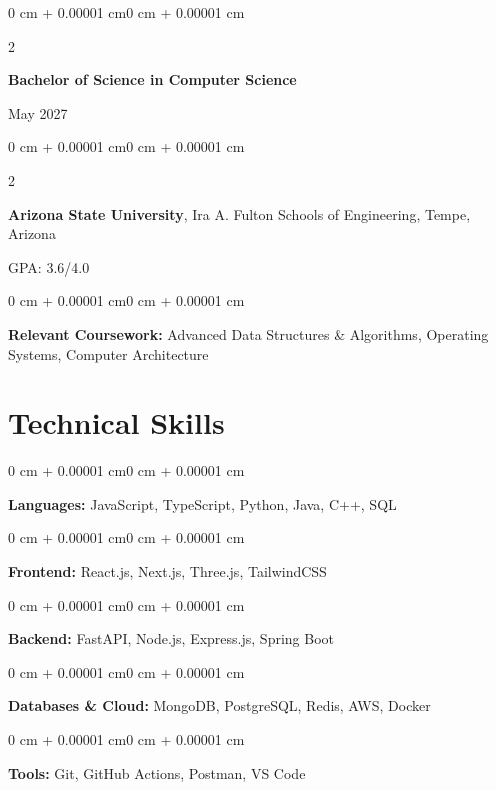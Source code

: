 \documentclass[10pt]{article}
\newenvironment{onecolentry}{
    \begin{adjustwidth}{0 cm + 0.00001 cm}{0 cm + 0.00001 cm}
}{
    \end{adjustwidth}
}
\newenvironment{twocolentry}[2][]{
    \onecolentry
    \def\secondColumn{#2}
    \setcolumnwidth{\fill, 4.5 cm}
    \begin{paracol}{2}
}{
    \switchcolumn \raggedleft \secondColumn
    \end{paracol}
    \endonecolentry
}
\begin{document}
    \begin{twocolentry}{May 2027}
        \textbf{Bachelor of Science in Computer Science}
    \end{twocolentry}
    
    \begin{twocolentry}{GPA: 3.6/4.0}
        \textbf{Arizona State University}, Ira A. Fulton Schools of Engineering, Tempe, Arizona
    \end{twocolentry}

    \begin{onecolentry}
     \textbf{Relevant Coursework:} Advanced Data Structures \& Algorithms, Operating Systems, Computer Architecture
    \end{onecolentry}

    \section{Technical Skills}
    
    \begin{onecolentry}
        \textbf{Languages:} JavaScript, TypeScript, Python, Java, C++, SQL
    \end{onecolentry}
    
    \vspace{0.06cm}
    
    \begin{onecolentry}
        \textbf{Frontend:} React.js, Next.js, Three.js, TailwindCSS
    \end{onecolentry}
    
    \vspace{0.06cm}
    
    \begin{onecolentry}
        \textbf{Backend:} FastAPI, Node.js, Express.js, Spring Boot
    \end{onecolentry}
    
    \vspace{0.06cm}
    
    \begin{onecolentry}
        \textbf{Databases \& Cloud:} MongoDB, PostgreSQL, Redis, AWS, Docker
    \end{onecolentry}
    
    \vspace{0.06cm}
    
    \begin{onecolentry}
        \textbf{Tools:} Git, GitHub Actions, Postman, VS Code
    \end{onecolentry}
 
\end{document}
